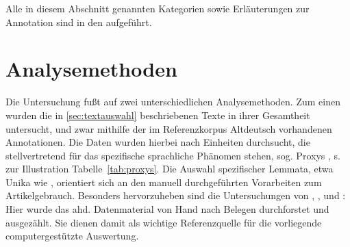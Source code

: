 Alle in diesem Abschnitt genannten Kategorien sowie Erläuterungen zur Annotation  sind in den  \parencite{HZKYL4_2020} aufgeführt.  



\section{Analysemethoden} \label{sec:analysemethoden}

Die Untersuchung fußt auf zwei unterschiedlichen Analysemethoden. Zum einen wurden die in \ref{sec:textauswahl} beschriebenen Texte in ihrer Gesamtheit untersucht, und zwar mithilfe der im Referenzkorpus Altdeutsch  vorhandenen  Annotationen. Die Daten wurden hierbei nach Einheiten durchsucht, die stellvertretend für das spezifische sprachliche Phänomen stehen, sog. Proxys  \parencite[vgl.][114]{Lemnitzer2015}, s. zur Illustration Tabelle~\ref{tab:proxys}. Die Auswahl spezifischer Lemmata, etwa Unika  wie  , orientiert sich an den manuell durchgeführten Vorarbeiten zum Artikelgebrauch. Besonders hervorzuheben sind die Untersuchungen von \textcite{Graf1905}, \textcite{Bell1907}, \textcite{Hodler1954} und \textcite{Oubouzar1989}: Hier wurde das ahd. Datenmaterial von Hand nach Belegen durchforstet und ausgezählt. Sie dienen damit als wichtige Referenzquelle für die vorliegende computergestützte Auswertung. 

